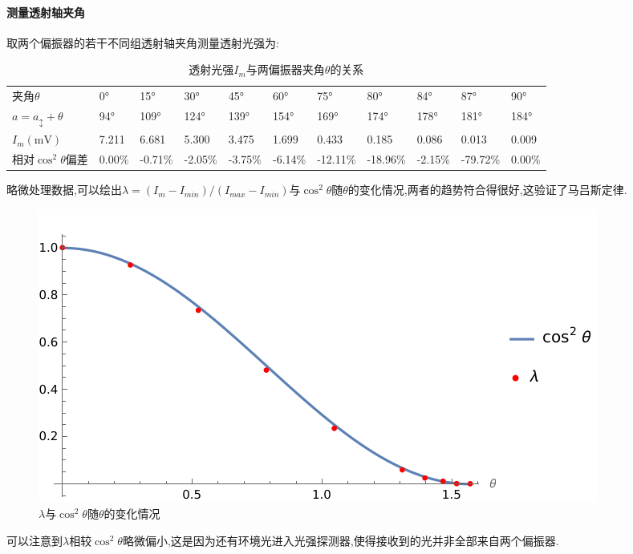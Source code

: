 \documentclass[UTF8,a4paper]{article}%
\begin{document}
\paragraph{测量透射轴夹角}
取两个偏振器的若干不同组透射轴夹角测量透射光强为:
\begin{table}[H]
    \centering
    \caption{透射光强$I_m$与两偏振器夹角$\theta$的关系}
    \begin{tabular}{l|llllllllll}
        \hline
        夹角$\theta$                & \ang{0}  & \ang{15}  & \ang{30}  & \ang{45}  & \ang{60}  & \ang{75}  & \ang{80}  & \ang{84}  & \ang{87}  & \ang{90}  \\
        $a=a_\updownarrow+\theta$ & \ang{94} & \ang{109} & \ang{124} & \ang{139} & \ang{154} & \ang{169} & \ang{174} & \ang{178} & \ang{181} & \ang{184} \\
        $I_m(\unit{\mV})$         & 7.211    & 6.681     & 5.300     & 3.475     & 1.699     & 0.433     & 0.185     & 0.086     & 0.013     & 0.009     \\
        相对$\cos^2\theta$偏差        & 0.00\%   & -0.71\%   & -2.05\%   & -3.75\%   & -6.14\%   & -12.11\%  & -18.96\%  & -2.15\%   & -79.72\%  & 0.00\%    \\\hline
    \end{tabular}
\end{table}
略微处理数据,可以绘出$\lambda=(I_m-I_{min})/(I_{max}-I_{min})$与$\cos^2\theta$随$\theta$的变化情况,两者的趋势符合得很好,这验证了马吕斯定律.
\begin{figure}[H]
    \centering
    \begin{minipage}[t]{0.5\linewidth}
        \centering
        \includegraphics[width=0.9\linewidth]{marius-law.png}
        \caption{$\lambda$与$\cos^2\theta$随$\theta$的变化情况}
        \label{fg:marius}
    \end{minipage}
\end{figure}
可以注意到$\lambda$相较$\cos^2\theta$略微偏小,这是因为还有环境光进入光强探测器,使得接收到的光并非全部来自两个偏振器.
\end{document}
